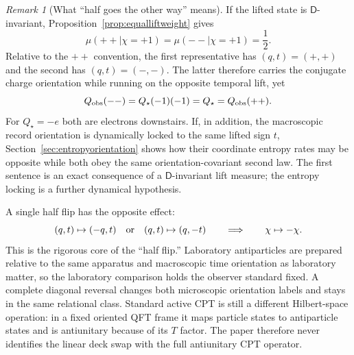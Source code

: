 \documentclass[11pt]{article}
\theoremstyle{definition}\newtheorem{definition}[theorem]{Definition}
\theoremstyle{remark}\newtheorem{remark}[theorem]{Remark}\newtheorem{conjecture}[theorem]{Conjecture}
\begin{document}
\begin{remark}[What ``half goes the other way'' means]\label{rem:halfelectroncover}
If the lifted state is $\mathsf D$-invariant, Proposition~\ref{prop:equalliftweight} gives
\begin{equation}\label{eq:halfelectroncover}
 \boxed{
 \mu(++\mid\chi=+1)=\mu(--\mid\chi=+1)=\frac12.}
\end{equation}
Relative to the $++$ convention, the first representative has $(q,t)=(+,+)$ and the second has $(q,t)=(-,-)$. The latter therefore carries the conjugate charge orientation while running on the opposite temporal lift, yet
\begin{equation}
 Q_{\rm obs}(--)=Q_\star(-1)(-1)=Q_\star=Q_{\rm obs}(++).
\end{equation}
For $Q_\star=-e$ both are electrons downstairs. If, in addition, the macroscopic record orientation is dynamically locked to the same lifted sign $t$, Section~\ref{sec:entropyorientation} shows how their coordinate entropy rates may be opposite while both obey the same orientation-covariant second law. The first sentence is an exact consequence of a $\mathsf D$-invariant lift measure; the entropy locking is a further dynamical hypothesis.
\end{remark}

A single half flip has the opposite effect:
\begin{equation}
 (q,t)\mapsto(-q,t)
 \quad\hbox{or}\quad
 (q,t)\mapsto(q,-t)
 \qquad\Longrightarrow\qquad
 \chi\mapsto-\chi.
\end{equation}
This is the rigorous core of the ``half flip.'' Laboratory antiparticles are prepared relative to the same apparatus and macroscopic time orientation as laboratory matter, so the laboratory comparison holds the observer standard fixed. A complete diagonal reversal changes both microscopic orientation labels and stays in the same relational class. Standard active CPT is still a different Hilbert-space operation: in a fixed oriented QFT frame it maps particle states to antiparticle states and is antiunitary because of its $T$ factor. The paper therefore never identifies the linear deck swap with the full antiunitary CPT operator.
\end{document}
